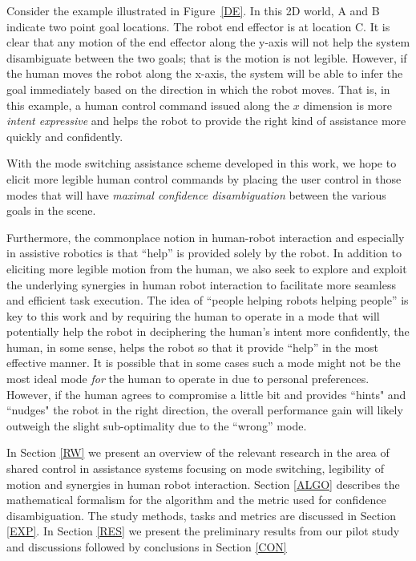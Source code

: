 \documentclass[conference]{IEEEtran}
\begin{document}
Consider the example illustrated in Figure~\ref{DE}. In this 2D world, A and B indicate two point goal locations. The robot end effector is at location C. It is clear that any motion of the end effector along the y-axis will not help the system disambiguate between the two goals; that is the motion is not legible. However, if the human moves the robot along the x-axis, the system will be able to infer the goal immediately based on the direction in which the robot moves. That is, in this example, a human control command issued along the $x$ dimension is more \textit{intent expressive} and helps the robot to provide the right kind of assistance more quickly and confidently. 

With the mode switching assistance scheme developed in this work, we hope to elicit more legible human control commands by placing the user control in those modes that will have \textit{maximal confidence disambiguation} between the various goals in the scene. 

Furthermore, the commonplace notion in human-robot interaction and especially in assistive robotics is that ``help'' is provided solely by the robot. In addition to eliciting more legible motion from the human, we also seek to explore and exploit the underlying synergies in human robot interaction to facilitate more seamless and efficient task execution. The idea of ``people helping robots helping people'' is key to this work and by requiring the human to operate in a mode that will potentially help the robot in deciphering the human's intent more confidently, the human, in some sense, helps the robot so that it provide ``help'' in the most effective manner. 
It is possible that in some cases such a mode might not be the most ideal mode \textit{for} the human to operate in due to personal preferences. However, if the human agrees to compromise a little bit and provides ``hints" and ``nudges" the robot in the right direction, the overall performance gain will likely outweigh the slight sub-optimality due to the ``wrong'' mode. 

In Section \ref{RW} we present an overview of the relevant research in the area of shared control in assistance systems focusing on mode switching, legibility of motion and synergies in human robot interaction. Section \ref{ALGO} describes the mathematical formalism for the algorithm and the metric used for confidence disambiguation. The study methods, tasks and metrics are discussed in Section \ref{EXP}. In Section \ref{RES} we present the preliminary results from our pilot study and discussions followed by conclusions in Section \ref{CON}
\end{document}
